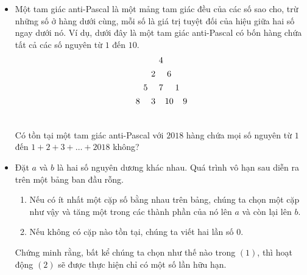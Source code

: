 \documentclass[11pt]{scrartcl}
\begin{document}
\begin{itemize}[label=, leftmargin=0em, itemsep=0.5em]
    \item \begin{btvn}
        Một tam giác anti-Pascal là một mảng tam giác đều của các số sao cho, trừ những số ở hàng dưới cùng, mỗi số là giá trị tuyệt đối của hiệu giữa hai số ngay dưới nó. Ví dụ, dưới đây là một tam giác anti-Pascal có bốn hàng chứa tất cả các số nguyên từ $1$ đến $10$.
        \[\begin{array}{
            c@{\hspace{4pt}}c@{\hspace{4pt}}
            c@{\hspace{4pt}}c@{\hspace{2pt}}c@{\hspace{2pt}}c@{\hspace{4pt}}c
            } \vspace{4pt}
            & & & 4 & & & \\\vspace{4pt}
            & & 2 & & 6 & & \\\vspace{4pt}
            & 5 & & 7 & & 1 & \\\vspace{4pt}
            8 & & 3 & & 10 & & 9 \\\vspace{4pt}
            \end{array}\]
            Có tồn tại một tam giác  anti-Pascal với $2018$ hàng chứa mọi số nguyên từ $1$ đến $1 + 2 + 3 + \dots + 2018$ không?
    \end{btvn}



    \item \begin{btvn}
        Đặt $a$ và $b$ là hai số nguyên dương khác nhau. Quá trình vô hạn sau diễn ra trên một bảng ban đầu rỗng.
        \begin{enumerate}
            \item Nếu có ít nhất một cặp số bằng nhau trên bảng, chúng ta chọn một cặp như vậy và tăng một trong các thành phần của nó lên $a$ và còn lại lên $b$.
            \item Nếu không có cặp nào tồn tại, chúng ta viết hai lần số $0$.
        \end{enumerate}
        Chứng minh rằng, bất kể chúng ta chọn như thế nào trong $(1)$, thì hoạt động $(2)$ sẽ được thực hiện chỉ có một số lần hữu hạn.
    \end{btvn}



\end{itemize}
\end{document}
